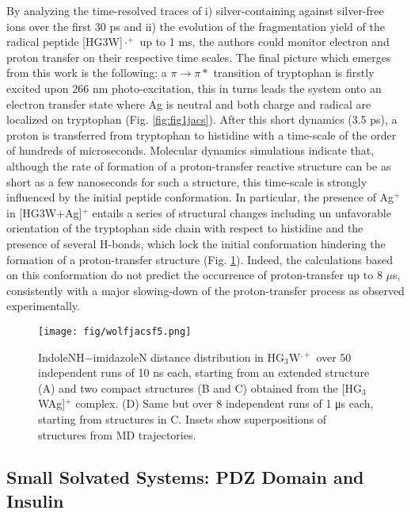 \documentclass[journal=jacsat,manuscript=article]{achemso}
\begin{document}
By analyzing the time-resolved traces of i) silver-containing against
silver-free ions over the first 30 ps and ii) the evolution of the
fragmentation yield of the radical peptide [HG3W]$\cdot ^+$ up to 1
ms, the authors could monitor electron and proton transfer on their
respective time scales. The final picture which emerges from this work
is the following: a $\pi \rightarrow \pi*$ transition of tryptophan is
firstly excited upon 266 nm photo-excitation, this in turns leads the
system onto an electron transfer state where Ag is neutral and both
charge and radical are localized on tryptophan
(Fig. \ref{fig:fig1jacs}). After this short dynamics (3.5 ps), a
proton is transferred from tryptophan to histidine with a time-scale
of the order of hundreds of microseconds. Molecular dynamics
simulations indicate that, although the rate of formation of a
proton-transfer reactive structure can be as short as a few
nanoseconds for such a structure, this time-scale is strongly
influenced by the initial peptide conformation. In particular, the
presence of Ag$^+$ in [HG3W+Ag]$^+$ entails a series of structural
changes including un unfavorable orientation of the tryptophan side
chain with respect to histidine and the presence of several H-bonds,
which lock the initial conformation hindering the formation of a
proton-transfer structure (Fig. \ref{fig:fig5jacs}). Indeed, the
calculations based on this conformation do not predict the occurrence
of proton-transfer up to 8 $\mu$s, consistently with a major
slowing-down of the proton-transfer process as observed
experimentally.



\begin{figure}[h]
\centering
\texttt{[image: fig/wolfjacsf5.png]}
\caption{IndoleNH−imidazoleN distance distribution in HG$_3$W$^{.+}$
  over 50 independent runs of 10 ns each, starting from an extended
  structure (A) and two compact structures (B and C) obtained from the
  [HG$_3$WAg]$^+$ complex. (D) Same but over 8 independent runs of 1
  μs each, starting from structures in C. Insets show superpositions
  of structures from MD trajectories.}
\label{fig:fig5jacs}
\end{figure}





\subsection{Small Solvated Systems: PDZ Domain and Insulin}
\end{document}
